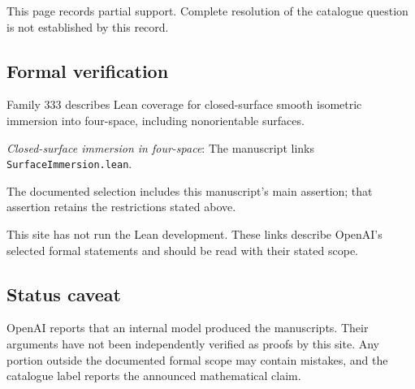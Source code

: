 \documentclass[11pt]{article}
\begin{document}
This page records partial support. Complete resolution of the catalogue question is not established by this record.

\subsection{Formal verification}
Family 333 describes Lean coverage for closed-surface smooth isometric immersion into four-space, including nonorientable surfaces.

\textit{Closed-surface immersion in four-space}: The manuscript links \texttt{SurfaceImmersion.lean}.

The documented selection includes this manuscript’s main assertion; that assertion retains the restrictions stated above.

This site has not run the Lean development. These links describe OpenAI’s selected formal statements and should be read with their stated scope.

\subsection{Status caveat}
OpenAI reports that an internal model produced the manuscripts. Their arguments have not been independently verified as proofs by this site. Any portion outside the documented formal scope may contain mistakes, and the catalogue label reports the announced mathematical claim.
\end{document}
